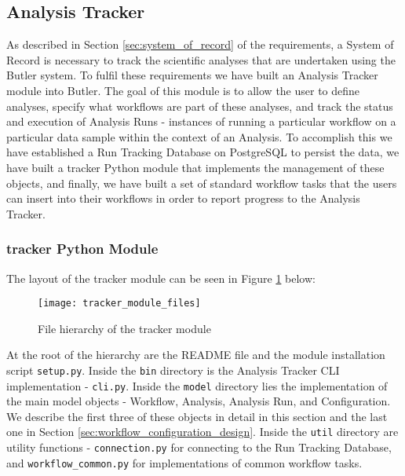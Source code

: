 \subsection{Analysis Tracker} 
\label{sec:analysis_tracker}

As described in Section \ref{sec:system_of_record} of the requirements, a System of Record is necessary to track the scientific analyses that are undertaken using the Butler system. To fulfil these requirements we have built an Analysis Tracker module into Butler. The goal of this module is to allow the user to define analyses, specify what workflows are part of these analyses, and track the status and execution of Analysis Runs - instances of running a particular workflow on a particular data sample within the context of an Analysis. To accomplish this we have established a Run Tracking Database on PostgreSQL to persist the data, we have built a tracker Python module that implements the management of these objects, and finally, we have built a set of standard workflow tasks that the users can insert into their workflows in order to report progress to the Analysis Tracker.

\subsubsection{tracker Python Module}

The layout of the tracker module can be seen in Figure \ref{fig:tracker_module_files} below:

\begin{figure}[h!]
\texttt{[image: tracker\_module\_files]}
\centering
\caption {File hierarchy of the tracker module}
\label{fig:tracker_module_files}
\end{figure}

At the root of the hierarchy are the README file and the module installation script \texttt{setup.py}. Inside the \texttt{bin} directory is the Analysis Tracker CLI implementation - \texttt{cli.py}. Inside the \texttt{model} directory lies the implementation of the main model objects - Workflow, Analysis, Analysis Run, and Configuration. We describe the first three of these objects in detail in this section and the last one in Section \ref{sec:workflow_configuration_design}. Inside the \texttt{util} directory are utility functions -  \texttt{connection.py} for connecting to the Run Tracking Database, and  \texttt{workflow_common.py} for implementations of common workflow tasks.

